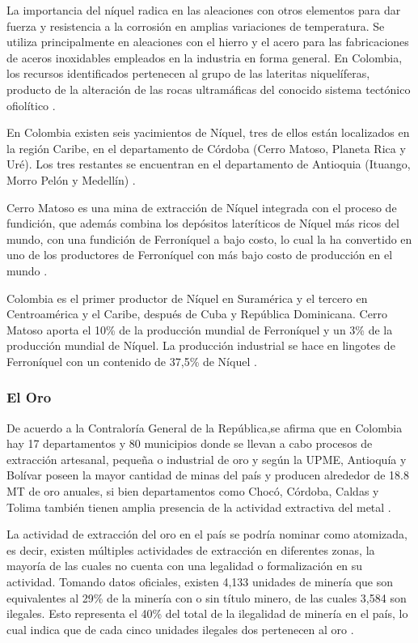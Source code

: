 La importancia del níquel radica en las aleaciones con otros elementos para dar fuerza y resistencia a la corrosión en amplias variaciones de temperatura. Se utiliza principalmente en aleaciones con el hierro y el acero para las fabricaciones de aceros inoxidables empleados en la industria en forma general. En Colombia, los recursos identificados pertenecen al grupo de las lateritas niquelíferas, producto de la alteración de las rocas ultramáficas del conocido sistema tectónico ofiolítico \cite{cardenas}.

En Colombia existen seis yacimientos de Níquel, tres de ellos están localizados en la región Caribe, en el departamento de Córdoba (Cerro Matoso, Planeta Rica  y Uré). Los tres restantes se encuentran en el departamento de Antioquia (Ituango, Morro Pelón y Medellín) \cite{niquelMain}.

Cerro Matoso es una mina de extracción de Níquel integrada con el proceso de  fundición, que además combina los depósitos lateríticos de Níquel más ricos del mundo, con una fundición de Ferroníquel a bajo costo, lo cual la ha convertido en uno de los productores de Ferroníquel con más bajo costo de producción en el mundo \cite{niquelMain}.

Colombia es el primer productor de Níquel en Suramérica y el tercero en Centroamérica y el Caribe, después de Cuba y República Dominicana. Cerro Matoso aporta el 10\% de la producción mundial de Ferroníquel y un 3\% de la producción mundial de Níquel. La producción industrial se hace en lingotes de Ferroníquel con un contenido de 37,5\% de Níquel \cite{niquelMain}.

\subsubsection{El Oro}
De acuerdo a la Contraloría General de la República,se afirma que en Colombia hay 17 departamentos y 80 municipios donde se llevan a cabo procesos de extracción artesanal, pequeña o industrial de oro y según la UPME, Antioquía y   Bolívar poseen la mayor cantidad de minas del país y producen alrededor de  18.8  MT de oro anuales, si bien departamentos como Chocó, Córdoba, Caldas y Tolima  también tienen amplia presencia de la actividad extractiva del metal \cite{oroMain}.

La actividad de extracción del oro en el país se podría nominar como atomizada, es decir, existen múltiples actividades de extracción en diferentes zonas, la mayoría de las cuales no cuenta con una legalidad o formalización en su actividad. Tomando datos oficiales, existen 4,133 unidades de minería que son  equivalentes al 29\% de la minería con o sin título minero, de las cuales 3,584 son ilegales. Esto representa el 40\% del total de la ilegalidad de minería en el país, lo cual indica que de cada cinco unidades ilegales dos pertenecen al oro \cite{oroMain}. 


